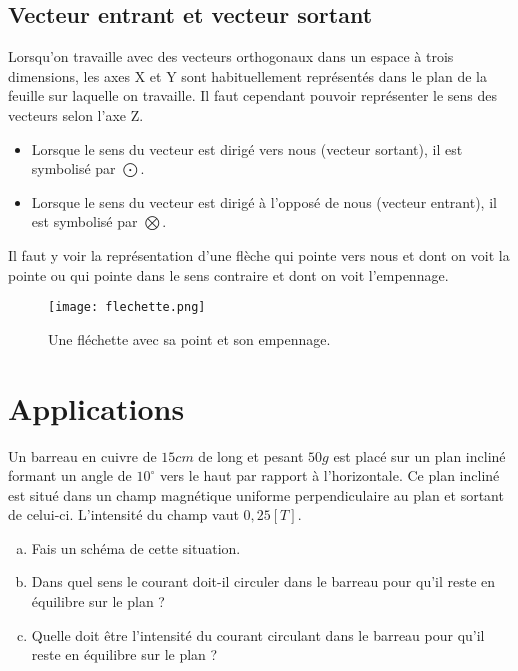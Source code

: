 \subsection{Vecteur entrant et vecteur sortant}
Lorsqu'on travaille avec des vecteurs orthogonaux dans un espace à trois dimensions, les axes X et Y sont habituellement représentés dans le plan de la feuille sur laquelle on travaille. Il faut cependant pouvoir représenter le sens des vecteurs selon l'axe Z.
\begin{itemize}[label=\textbullet]
    \item Lorsque le sens du vecteur est dirigé vers nous (vecteur sortant), il est symbolisé par \(\bigodot\).
    \item Lorsque le sens du vecteur est dirigé à l'opposé de nous (vecteur entrant), il est symbolisé par \(\bigotimes\).
\end{itemize}
Il faut y voir la représentation d'une flèche qui pointe vers nous et dont on voit la pointe ou qui pointe dans le sens contraire et dont on voit l'empennage.


\begin{figure}[h]
    \centering
    \texttt{[image: flechette.png]}
    \caption{Une fléchette avec sa point et son empennage.}
    \label{flechette}
\end{figure}

\section{Applications}
\begin{exercise}
    Un barreau en cuivre de \(15cm\) de long et pesant \(50g\) est placé sur un plan incliné formant un angle de \(10^\circ\) vers le haut par rapport à l'horizontale. Ce plan incliné est situé dans un champ magnétique uniforme perpendiculaire au plan et sortant de celui-ci. L'intensité du champ vaut \(0,25[T]\).
    \begin{enumerate}[a)]
        \item Fais un schéma de cette situation.
        \item Dans quel sens le courant doit-il circuler dans le barreau pour qu'il reste en équilibre sur le plan ?
        \item Quelle doit être l'intensité du courant circulant dans le barreau pour qu'il reste en équilibre sur le plan ?
    \end{enumerate}
\end{exercise}

